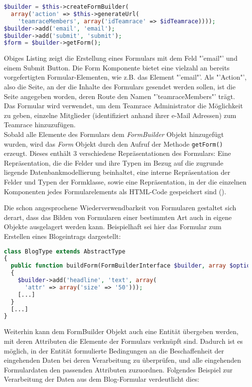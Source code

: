 \documentclass[12pt]{report}
\begin{document}
\begin{lstlisting}[language=php, caption=Auszug aus \\src/TeamRace/WebBundle/Controller/TeamraceController.php, showstringspaces=false]
$builder = $this->createFormBuilder(
  array('action' => $this->generateUrl(
    'teamraceMembers', array('idTeamrace' => $idTeamrace))));
$builder->add('email', 'email');
$builder->add('submit', 'submit');
$form = $builder->getForm();
\end{lstlisting}
Obiges Listing zeigt die Erstellung eines Formulars mit dem Feld "'email"' und einem Submit Button. Die Form Komponente bietet eine vielzahl an bereits vorgefertigten Formular-Elementen, wie z.B. das Element "'email"'. Als "'Action"', also die Seite, an der die Inhalte des Formulars gesendet werden sollen, ist die Seite angegeben worden, deren Route den Namen "'teamraceMembers"' trägt. Das Formular wird verwendet, um dem Teamrace Administrator die Möglichkeit zu geben, einzelne Mitglieder (identifiziert anhand ihrer e-Mail Adressen) zum Teamrace hinzuzufügen.\\

Sobald alle Elemente des Formulars dem \emph{FormBuilder} Objekt hinzugefügt wurden, wird das \emph{Form} Objekt durch den Aufruf der Methode \texttt{getForm()} erzeugt. Dieses enthält 3 verschiedene Repräsentationen des Formulars: Eine Repräsentation, die die Felder und ihre Typen im Bezug auf die zugrunde liegende Datenbankmodellierung beinhaltet, eine interne Repräsentation der Felder und Typen der Formklasse, sowie eine Repräsentation, in der die einzelnen Komponenten jedes Formularelements als HTML-Code gespeichert sind (\cite{sf2:FormAPI}).

Die schon angesprochene Wiederverwendbarkeit von Formularen gestaltet sich derart, dass das Bilden von Formularen einer bestimmten Art auch in eigene Objekte ausgelagert werden kann. Beispielhaft sei hier das Formular zum Erstellen eines Blogeintrags dargestellt:

\begin{lstlisting}[language=php, caption=Auszug aus src/TeamRace/WebBundle/Form/Type/BlogType.php, showstringspaces=false]
class BlogType extends AbstractType
{
  public function buildForm(FormBuilderInterface $builder, array $options) 
  {
    $builder->add('headline', 'text', array(
      'attr' => array('size' => '50')));
    [...]
  }
  [...]
}
\end{lstlisting}
Weiterhin kann dem FormBuilder Objekt auch eine Entität übergeben werden, mit deren Attributen die Elemente der Formulars verknüpft sind. Dadurch ist es möglich, in der Entität formulierte Bedingungen an die Beschaffenheit der eingehenden Daten bei deren Verarbeitung zu überprüfen, und alle eingehenden Formulardaten den passenden Attributen zuzuordnen. Folgendes Beispiel zur Verarbeitung der Daten aus dem Blog-Formular verdeutlicht dies:
\end{document}
